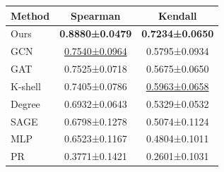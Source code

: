 \begin{tabular}{lcc}
\toprule
Method & Spearman & Kendall\\
\midrule
Ours & \textbf{0.8880±0.0479} & \textbf{0.7234±0.0650}\\
GCN & \underline{0.7540±0.0964} & 0.5795±0.0934\\
GAT & 0.7525±0.0718 & 0.5675±0.0650\\
K-shell & 0.7405±0.0786 & \underline{0.5963±0.0658}\\
Degree & 0.6932±0.0643 & 0.5329±0.0532\\
SAGE & 0.6798±0.1278 & 0.5074±0.1124\\
MLP & 0.6523±0.1167 & 0.4804±0.1011\\
PR & 0.3771±0.1421 & 0.2601±0.1031\\
\bottomrule
\end{tabular}